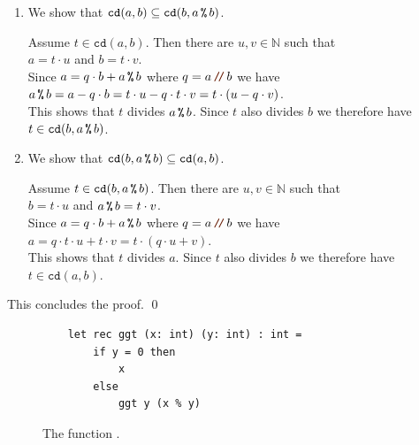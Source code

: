\begin{enumerate}
\item We show that $\mathtt{cd}(a, b) \subseteq \mathtt{cd}(b, a \,\texttt{\%}\, b)$.

      Assume $t \in \mathtt{cd}(a, b)$.  Then there are $u, v \in \mathbb{N}$ such that
      \\[0.2cm]
      \hspace*{1.3cm}
      $a = t \cdot u$ \quad and \quad $b = t \cdot v$.
      \\[0.2cm]
      Since $a = q \cdot b + a \,\texttt{\%}\, b$ where $q = a \dv b$ we have
      \\[0.2cm]
      \hspace*{1.3cm}
      $a \,\texttt{\%}\, b = a - q \cdot b = t \cdot u - q \cdot t \cdot v = t \cdot (u - q \cdot v)$.
      \\[0.2cm]
      This shows that $t$ divides $a \,\texttt{\%}\, b$. Since $t$ also divides $b$ we therefore have
      $t \in \mathtt{cd}(b, a \,\texttt{\%}\, b)$. \green{$\surd$}
\item We show that $\mathtt{cd}(b, a \,\texttt{\%}\, b) \subseteq \mathtt{cd}(a, b)$.

      Assume $t \in \mathtt{cd}(b, a \,\texttt{\%}\, b)$.  Then there are $u, v \in \mathbb{N}$ such that
      \\[0.2cm]
      \hspace*{1.3cm}
      $b = t \cdot u$ \quad and \quad $a \,\texttt{\%}\, b = t \cdot v$.
      \\[0.2cm]
      Since $a = q \cdot b + a \,\texttt{\%}\, b$ where $q = a \dv b$ we have
      \\[0.2cm]
      \hspace*{1.3cm}
      $a = q \cdot t \cdot u + t \cdot v = t \cdot (q \cdot u + v)$.
      \\[0.2cm]
      This shows that $t$ divides $a$. Since $t$ also divides $b$ we therefore have
      $t \in \mathtt{cd}(a, b)$. \green{$\surd$}
\end{enumerate}
This concludes the proof. \qed

\begin{figure}[!h]
  \centering
\begin{verbatim}
    let rec ggt (x: int) (y: int) : int =
        if y = 0 then
            x
        else
            ggt y (x % y)
\end{verbatim}
\vspace*{-0.3cm}
  \caption{The function .}
  \label{fig:gcd}
\end{figure}

